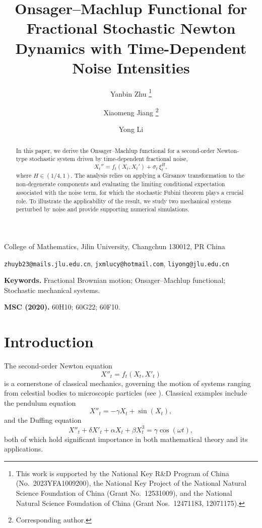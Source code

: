 \documentclass{article}
\title{Onsager--Machlup Functional for Fractional Stochastic Newton Dynamics with Time-Dependent Noise Intensities}
\author{
Yanbin Zhu%
\thanks{This work is supported by the National Key R\&D Program of China (No.~2023YFA1009200), the National Key Project of the National Natural Science Foundation of China (Grant No.~12531009), and the National Natural Science Foundation of China (Grant Nos.~12471183, 12071175).}
\and
Xiaomeng Jiang%
\thanks{Corresponding author.}
\and
Yong Li
}
\date{}
\theoremstyle{definition}  %
\theoremstyle{plain}  %
\begin{document}
\maketitle

\begin{center}
College of Mathematics, Jilin University, Changchun 130012, PR China
\end{center}

\begin{center}
\texttt{zhuyb23@mails.jlu.edu.cn},
\texttt{jxmlucy@hotmail.com},
\texttt{liyong@jlu.edu.cn}
\end{center}

\begin{abstract}
In this paper, we derive the Onsager--Machlup functional for a second-order Newton-type stochastic system driven by time-dependent fractional noise,
\[
    X_t'' = f_t(X_t, X_t') + \sigma_t \,\xi_t^{H},
\]
where \( H \in (1/4,1) \). The analysis relies on applying a Girsanov transformation to the non-degenerate components and evaluating the limiting conditional expectation associated with the noise term, for which the stochastic Fubini theorem plays a crucial role. To illustrate the applicability of the result, we study two mechanical systems perturbed by noise and provide supporting numerical simulations.
\end{abstract}

\medskip
\noindent\textbf{Keywords.}
Fractional Brownian motion; Onsager--Machlup functional; Stochastic mechanical systems.

\medskip
\noindent\textbf{MSC (2020).}
60H10; 60G22; 60F10.

\allowdisplaybreaks

\section{Introduction}
The second-order Newton equation
\begin{equation*}
    X''_t = f_t(X_t, X'_t)
\end{equation*}
is a cornerstone of classical mechanics, governing the motion of systems ranging from celestial bodies to microscopic particles (see \cite{Arnold1978}). Classical examples include the pendulum equation
\[
X''_t = -\gamma X_t + \sin(X_t),
\]
and the Duffing equation
\[
X''_t + \delta X'_t + \alpha X_t + \beta X_t^3 = \gamma \cos(\omega t),
\]
both of which hold significant importance in both mathematical theory and its applications.
\end{document}
